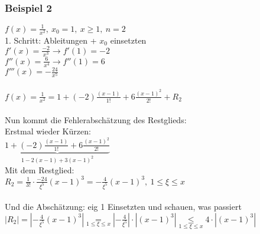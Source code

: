 \documentclass[12pt,a4paper]{article}
\newcommand\underrel[2]{\mathrel{\mathop{#2}\limits_{#1}}}
\begin{document}
\subsubsection{Beispiel 2}
$f(x)=\frac{1}{x^2},\ x_0=1,\ x\geq1,\ n=2$\\
1. Schritt: Ableitungen + $x_0$ einsetzten\\
\hspace*{1cm}$f'(x)=\frac{-2}{x^3}\rightarrow f'(1)=-2$\\
\hspace*{1cm}$f''(x)=\frac{6}{x^4}\rightarrow f''(1)=6$\\
\hspace*{1cm}$f'''(x)=-\frac{24}{x^5}$\\
\\
\hspace*{1cm}$f(x)=\frac{1}{x^2}=1+(-2)\frac{\left(x-1\right)}{1!}+6\frac{\left(x-1\right)^2}{2!}+R_2$\\
\\
Nun kommt die Fehlerabschätzung des Restglieds:\\
Erstmal wieder Kürzen:\\
$\underbrace{1+(-2)\frac{\left(x-1\right)}{1!}+6\frac{\left(x-1\right)^2}{2!}}_{1-2\left(x-1\right)+3\left(x-1\right)^2}$\\
\newpage
Mit dem Restglied:\\
$R_2=\frac{1}{3!}\cdot\frac{-24}{\xi^5}\left(x-1\right)^3=-\frac{4}{\xi^5}\left(x-1\right)^3,\ 1\leq\xi\leq x$\\
\\
Und die Abschätzung: eig 1 Einsetzten und schauen, was passiert\\
$\left|R_2\right|=\left|-\frac{4}{\xi^5}\left(x-1\right)^3\right|\underrel{1\leq\xi\leq x}{=}\left|-\frac{4}{\xi^5}\right|\cdot\left|\left(x-1\right)^3\right|\underrel{1\leq\xi\leq x}{\leq}4\cdot\left|\left(x-1\right)^3\right|$\\
\end{document}
